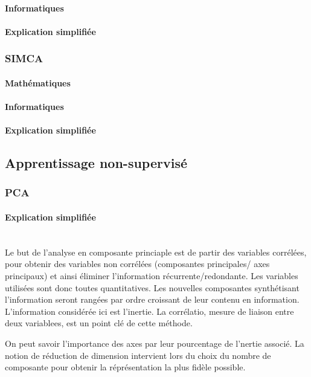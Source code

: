 \documentclass[12pt]{report}
\begin{document}
\paragraph{Informatiques}
\paragraph{Explication simplifiée}

\subsubsection{SIMCA}

\paragraph{Mathématiques}
\paragraph{Informatiques}
\paragraph{Explication simplifiée}

\subsection{Apprentissage non-supervisé}

\subsubsection{PCA}

\paragraph{Explication simplifiée}\mbox{}\\

Le but de l'analyse en composante princiaple est de partir des variables corrélées, pour obtenir des variables non corrélées (composantes principales/ axes principaux) et ainsi éliminer l’information récurrente/redondante. Les variables utilisées sont donc toutes quantitatives. Les nouvelles composantes synthétisant l'information seront rangées par ordre croissant de leur contenu en information. L'information considérée ici est l'inertie. La corrélatio, mesure de liaison entre deux variablees, est un point clé de cette méthode.

On peut savoir l'importance des axes par leur pourcentage de l'nertie associé.
La notion de réduction de dimension intervient lors du choix du nombre de composante pour obtenir la réprésentation la plus fidèle possible.
\end{document}
